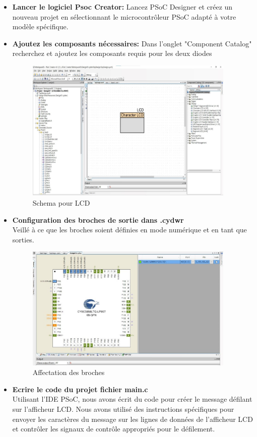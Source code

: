  \begin{itemize}
     \item \textbf{Lancer le logiciel Psoc Creator:}
     Lancez PSoC Designer et créez un nouveau projet en sélectionnant 
     le microcontrôleur PSoC adapté à votre modèle spécifique.
     \item \textbf{Ajoutez les composants nécessaires: } 
     Dans l'onglet "Component Catalog"
     recherchez et ajoutez les composants requis pour les deux diodes
     \begin{figure}[htp]
         \centering
         \includegraphics[width=10cm]{images/schema4.jpg }
         \caption{Schema pour LCD }
         \label{fig:example15}
       \end{figure}
       \newpage
     \item \textbf{Configuration des broches de sortie dans .cydwr}\\
     Veillé à ce que les broches soient définies en mode numérique et en tant que sorties.
    
     \begin{figure}[htp]
         \centering
         \includegraphics[width=10cm]{images/broche4.jpg }
         \caption{Affectation des broches }
         \label{fig:example16}
       \end{figure}
     \item \textbf{Ecrire le code du projet fichier main.c}\\
     Utilisant l'IDE PSoC, nous avons écrit du code pour créer le message défilant sur l'afficheur LCD.
     Nous avons utilisé des instructions spécifiques pour envoyer les caractères du message sur les lignes de données de l'afficheur LCD et contrôler les signaux de contrôle appropriés pour le défilement.
     

\end{itemize}
